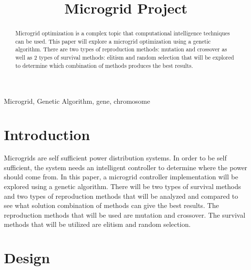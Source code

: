 \documentclass[conference]{IEEEtran}
\begin{document}
\title{Microgrid Project\\}

\author{
}

\maketitle

\begin{abstract}
    Microgrid optimization is a complex topic that computational intelligence techniques can be used. This paper will explore a microgrid optimization using a genetic algorithm.  There are two types of reproduction methods: mutation and crossover as well as 2 types of survival methods: elitism and random selection that will be explored to determine which combination of methods produces the best results.
\end{abstract}
\begin{IEEEkeywords}
Microgrid, Genetic Algorithm, gene, chromosome
\end{IEEEkeywords}

\section{Introduction}
    Microgrids are self sufficient power distribution systems.  In order to be self sufficient, the system needs an intelligent controller to determine where the power should come from.  In this paper, a microgrid controller implementation will be explored using a genetic algorithm.  There will be two types of survival methods and two types of reproduction methods that will be analyzed and compared to see what solution combination of methods can give the best results. The reproduction methods that will be used are mutation and crossover.  The survival methods that will be utilized are elitism and random selection.

\section{Design}
\end{document}
